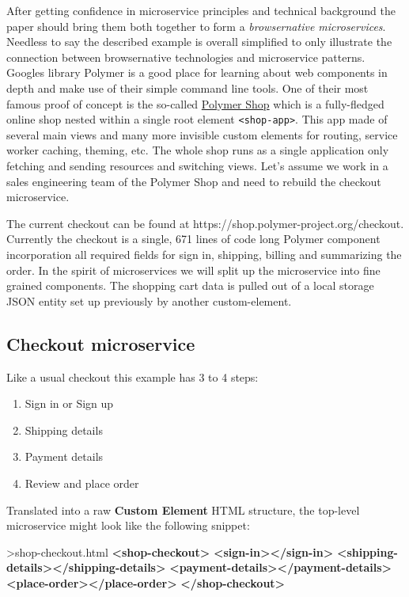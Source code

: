 \documentclass[]{article}
\newenvironment{Shaded}{}{}
\newcommand{\KeywordTok}[1]{\textcolor[rgb]{0.00,0.44,0.13}{\textbf{{#1}}}}
\newcommand{\NormalTok}[1]{{#1}}
\providecommand{\tightlist}{%
  \setlength{\itemsep}{0pt}\setlength{\parskip}{0pt}}
\begin{document}
After getting confidence in microservice principles and technical
background the paper should bring them both together to form a
\emph{browsernative microservices}. Needless to say the described
example is overall simplified to only illustrate the connection between
browsernative technologies and microservice patterns. Googles library
Polymer is a good place for learning about web components in depth and
make use of their simple command line tools. One of their most famous
proof of concept is the so-called
\href{https://shop.polymer-project.org/}{Polymer Shop} which is a
fully-fledged online shop nested within a single root element
\texttt{\textless{}shop-app\textgreater{}}. This app made of several
main views and many more invisible custom elements for routing, service
worker caching, theming, etc. The whole shop runs as a single
application only fetching and sending resources and switching views.
Let's assume we work in a sales engineering team of the Polymer Shop and
need to rebuild the checkout microservice.

The current checkout can be found at
https://shop.polymer-project.org/checkout. Currently the checkout is a
single, 671 lines of code long Polymer component incorporation all
required fields for sign in, shipping, billing and summarizing the
order. In the spirit of microservices we will split up the microservice
into fine grained components. The shopping cart data is pulled out of a
local storage JSON entity set up previously by another custom-element.

\subsection{Checkout microservice}\label{checkout-microservice}

Like a usual checkout this example has 3 to 4 steps:

\begin{enumerate}
\def\labelenumi{\arabic{enumi}.}
\tightlist
\item
  Sign in or Sign up
\item
  Shipping details
\item
  Payment details
\item
  Review and place order
\end{enumerate}

Translated into a raw \textbf{Custom Element} HTML structure, the
top-level microservice might look like the following snippet:

\begin{Shaded}
\begin{Highlighting}[]
\NormalTok{>shop-checkout.html}
\KeywordTok{<shop-checkout>}
  \KeywordTok{<sign-in></sign-in>}
  \KeywordTok{<shipping-details></shipping-details>}
  \KeywordTok{<payment-details></payment-details>}
  \KeywordTok{<place-order></place-order>}
\KeywordTok{</shop-checkout>}
\end{Highlighting}
\end{Shaded}
\end{document}
